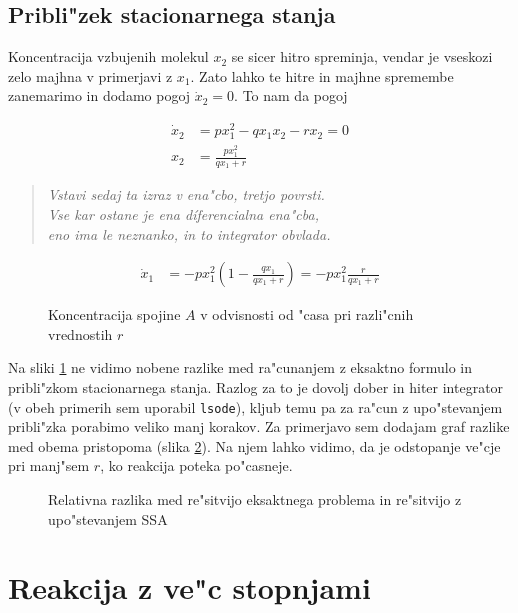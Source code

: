 \documentclass[a4paper,10pt]{article}
\begin{document}
\subsection{Pribli"zek stacionarnega stanja}
Koncentracija vzbujenih molekul $x_2$ se sicer hitro spreminja, vendar je vseskozi zelo majhna v primerjavi z $x_1$. Zato lahko te hitre in majhne spremembe zanemarimo in dodamo pogoj $\dot x_2 = 0$. To nam da pogoj

\begin{align}
 \dot x_2 &= p x_1^2 - q x_1 x_2 - r x_2 = 0\\
 x_2 &= \frac{px_1^2}{qx_1 + r}
\end{align}

\begin{verse}
\textit{Vstavi sedaj ta izraz v ena"cbo, tretjo povrsti. \\%
Vse kar ostane je ena d\'iferencialna ena"cba, \\
eno ima le neznanko, in to integrator obvlada. }
\end{verse}

\begin{align}
\dot x_1 &= -p x_1^2 \left( 1 - \frac{qx_1}{qx_1 + r} \right) = -px_1^2 \frac{r}{qx_1 + r}
\end{align}

\begin{figure}
 
  \caption{Koncentracija spojine $A$ v odvisnosti od "casa pri razli"cnih vrednostih $r$}
  \label{fig:binarna}
\end{figure}

Na sliki \ref{fig:binarna} ne vidimo nobene razlike med ra"cunanjem z eksaktno formulo in pribli"zkom stacionarnega stanja. Razlog za to je dovolj dober in hiter integrator (v obeh primerih sem uporabil \texttt{lsode}), kljub temu pa za ra"cun z upo"stevanjem pribli"zka porabimo veliko manj korakov. Za primerjavo sem dodajam graf razlike med obema pristopoma (slika \ref{fig:binarna-dif}). Na njem lahko vidimo, da je odstopanje ve"cje pri manj"sem $r$, ko reakcija poteka po"casneje. 

\begin{figure}
  
  \caption{Relativna razlika med re"sitvijo eksaktnega problema in re"sitvijo z upo"stevanjem SSA}
  \label{fig:binarna-dif}
\end{figure}
\section{Reakcija z ve"c stopnjami}
\end{document}
